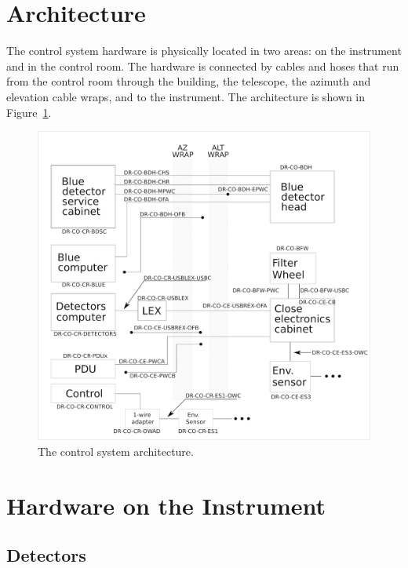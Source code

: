 \documentclass{article}
\begin{document}
\newpage

\pagestyle{plain}

\tableofcontents

\clearpage
\section{Architecture}

The control system hardware is physically located in two areas: on the instrument and in the control room. The hardware is connected by cables and hoses that run from the control room through the building, the telescope, the azimuth and elevation cable wraps, and to the instrument. The architecture is shown in Figure~\ref{figure:electronics-architecture}.

\begin{figure}[bp]
\begin{center}
\includegraphics[width=0.9\linewidth]{figures/electronics-architecture.png}
\end{center}
\caption{The control system architecture.}
\label{figure:electronics-architecture}
\end{figure}


\clearpage
\section{Hardware on the Instrument}

\subsection{Detectors}
\label{section:detectors}
\end{document}
